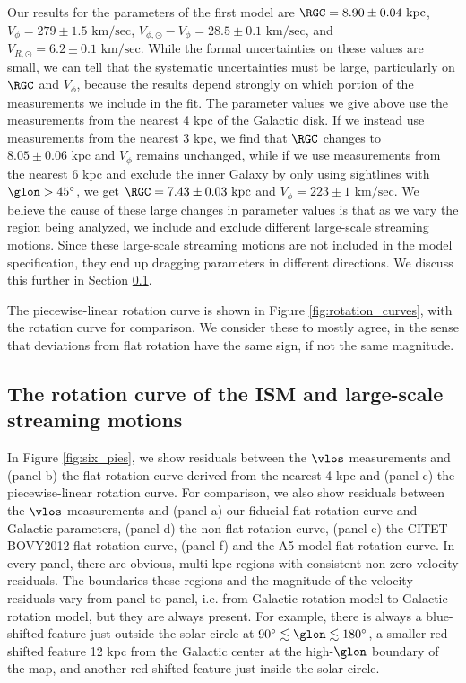 Our results for the parameters of the first model are $\RGC=8.90 \pm 0.04 \text{ kpc}$, $V_\phi = 279 \pm 1.5 \text{ km/sec}$, $V_{\phi, \odot} - V_\phi = 28.5 \pm 0.1 \text{ km/sec}$, and $V_{R, \odot} = 6.2 \pm 0.1 \text{ km/sec}$.
While the formal uncertainties on these values are small, we can tell that the systematic uncertainties must be large, particularly on $\RGC$ and $V_\phi$, because the results depend strongly on which portion of the measurements we include in the fit.
The parameter values we give above use the measurements from the nearest 4 kpc of the Galactic disk.
If we instead use measurements from the nearest 3 kpc, we find that $\RGC$ changes to $8.05 \pm 0.06 \text{ kpc}$ and $V_\phi$ remains unchanged, while if we use measurements from the nearest 6 kpc and exclude the inner Galaxy by only using sightlines with $\glon > 45^\circ$, we get $\RGC = 7.43 \pm 0.03 \text{ kpc}$ and $V_\phi = 223 \pm 1 \text{ km/sec}$.
We believe the cause of these large changes in parameter values is that as we vary the region being analyzed, we include and exclude different large-scale streaming motions. 
Since these large-scale streaming motions are not included in the model specification, they end up dragging parameters in different directions.
We discuss this further in Section \ref{sec:rotation_discussion}.

The piecewise-linear rotation curve is shown in Figure \ref{fig:rotation_curves}, with the \Clemens rotation curve for comparison. 
We consider these to mostly agree, in the sense that deviations from flat rotation have the same sign, if not the same magnitude. 

\subsection{The rotation curve of the ISM and large-scale streaming motions}
\label{sec:rotation_discussion}
In Figure \ref{fig:six_pies}, we show residuals between the $\vlos$ measurements and (panel b) the flat rotation curve derived from the nearest 4 kpc and (panel c) the piecewise-linear rotation curve. 
For comparison, we also show residuals between the $\vlos$ measurements and (panel a) our fiducial flat rotation curve and Galactic parameters, (panel d) the \Clemens non-flat rotation curve, (panel e) the CITET BOVY2012 flat rotation curve, (panel f) and the \Reid A5 model flat rotation curve. 
In every panel, there are obvious, multi-kpc regions with consistent non-zero velocity residuals.
The boundaries these regions and the magnitude of the velocity residuals vary from panel to panel, i.e. from Galactic rotation model to Galactic rotation model, but they are always present.
For example, there is always a blue-shifted feature just outside the solar circle at $90^\circ \lesssim \glon \lesssim 180^\circ$, a smaller red-shifted feature 12 kpc from the Galactic center at the high-$\glon$ boundary of the map, and another red-shifted feature just inside the solar circle. 


